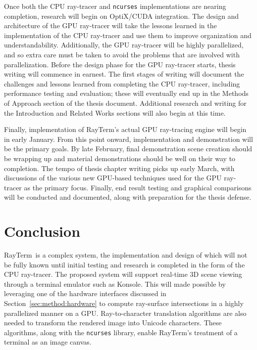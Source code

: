 \documentclass[11pt]{article}
\newcommand{\name}{{\sc RayTerm}}
\begin{document}
Once both the CPU ray-tracer and \texttt{ncurses} implementations are nearing completion, research will begin on OptiX/CUDA integration.
The design and architecture of the GPU ray-tracer will take the lessons learned in the implementation of the CPU ray-tracer and use them to improve organization and understandability.
Additionally, the GPU ray-tracer will be highly parallelized, and so extra care must be taken to avoid the problems that are involved with parallelization.
Before the design phase for the GPU ray-tracer starts, thesis writing will commence in earnest.
The first stages of writing will document the challenges and lessons learned from completing the CPU ray-tracer, including performance testing and evaluation; these will eventually end up in the Methods of Approach section of the thesis document.
Additional research and writing for the Introduction and Related Works sections will also begin at this time.

Finally, implementation of \name's actual GPU ray-tracing engine will begin in early January.
From this point onward, implementation and demonstration will be the primary goals.
By late February, final demonstration scene creation should be wrapping up and material demonstrations should be well on their way to completion.
The tempo of thesis chapter writing picks up early March, with discussions of the various new GPU-based techniques used for the GPU ray-tracer as the primary focus.
Finally, end result testing and graphical comparisons will be conducted and documented, along with preparation for the thesis defense.

\section{Conclusion}
\label{sec:conclusion}


\name\ is a complex system, the implementation and design of which will not be fully known until initial testing and research is completed in the form of the CPU ray-tracer.
The proposed system will support real-time 3D scene viewing through a terminal emulator such as Konsole.
This will made possible by leveraging one of the hardware interfaces discussed in Section~\ref{sec:method:hardware} to compute ray-surface intersections in a highly parallelized manner on a GPU.
Ray-to-character translation algorithms are also needed to transform the rendered image into Unicode characters.
These algorithms, along with the \texttt{ncurses} library, enable \name's treatment of a terminal as an image canvas.
\end{document}
